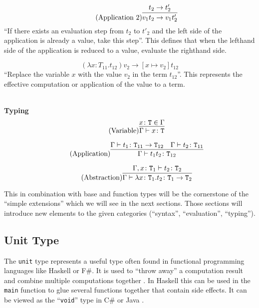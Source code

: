 \begin{equation*}
    \tag{Application 2}
    \infer{
        v_1 t_2 \rightarrow v_1 t'_2
    }{
        t_2 \rightarrow t'_2
    }
\end{equation*}
``If there exists an evaluation step from $t_2$ to $t'_2$ and the left
side of the application is already a value, take this step''. This defines
that when the lefthand side of the application is reduced to a value, evaluate
the righthand side.

\begin{equation*}
    \tag{Application Abstraction}
    (\lambda x \colon T_{11} . t_{12}) v_2 \rightarrow [x \mapsto v_2] t_{12}
\end{equation*}
``Replace the variable $x$ with the value $v_2$ in the term $t_{12}$''. This represents
the effective computation or application of the value to a term.

~\\
\textbf{Typing}
\begin{equation*}
    \tag{Variable}
    \infer{
        \Gamma \vdash x \colon \texttt{T}
    }{
        x \colon \texttt{T} \in \Gamma
    }
\end{equation*}

\begin{equation*}
    \tag{Application}
    \infer{
        \Gamma \vdash t_1 t_2 \colon \texttt{T}_{12}
    }{
        \Gamma \vdash t_1 \colon \texttt{T}_{11} \rightarrow \texttt{T}_{12}
        &
        \Gamma \vdash t_2 \colon \texttt{T}_{11}
    }
\end{equation*}

\begin{equation*}
    \tag{Abstraction}
    \infer{
        \Gamma \vdash \lambda x \colon \texttt{T}_1 . t_2 \colon \texttt{T}_1 \rightarrow \texttt{T}_2
    }{
        \Gamma,x \colon \texttt{T}_1 \vdash t_2 \colon \texttt{T}_2
    }
\end{equation*}

This in combination with base and function types will be the
cornerstone of the ``simple extensions'' which we will see in the
next sections. Those sections will introduce new elements to the given
categories (``syntax'', ``evaluation'', ``typing'').

\subsection{Unit Type}

The \texttt{unit} type represents a useful type often found in functional
programming languages like Haskell or F\#. It is used to ``throw away'' a
computation result and combine multiple computations together \cite{pierce2002ProgLang}.
In Haskell this can be used in the \texttt{main} function to glue
several functions together that contain side effects. It can be viewed as
the ``\texttt{void}'' type in C\# or Java \cite{pierce2002ProgLang}.

